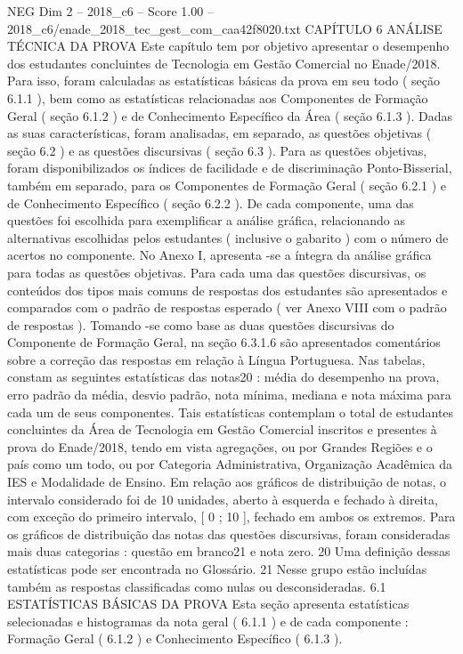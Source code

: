 \begin{textsample}{NEG Dim 2 – 2018\_c6 – Score 1.00 – 2018\_c6/enade\_2018\_tec\_gest\_com\_caa42f8020.txt}  \label{ex:f2_neg_243}
CAPÍTULO 6 ANÁLISE TÉCNICA DA PROVA Este capítulo tem por objetivo apresentar o desempenho dos estudantes concluintes de Tecnologia em Gestão Comercial no Enade/2018.
Para isso, foram calculadas as estatísticas básicas da prova em seu todo ( seção 6.1.1 ), bem como as estatísticas relacionadas aos Componentes de Formação Geral ( seção 6.1.2 ) e de Conhecimento Específico da Área ( seção 6.1.3 ).
Dadas as suas características, foram analisadas, em separado, as questões objetivas ( seção 6.2 ) e as questões discursivas ( seção 6.3 ).
Para as questões objetivas, foram disponibilizados os índices de facilidade e de discriminação Ponto-Bisserial, também em separado, para os Componentes de Formação Geral ( seção 6.2.1 ) e de Conhecimento Específico ( seção 6.2.2 ).
De cada componente, uma das questões foi escolhida para exemplificar a análise gráfica, relacionando as alternativas escolhidas pelos estudantes ( inclusive o gabarito ) com o número de acertos no componente.
No Anexo I, apresenta -se a íntegra da análise gráfica para todas as questões objetivas.
Para cada uma das questões discursivas, os conteúdos dos tipos mais comuns de respostas dos estudantes são apresentados e comparados com o padrão de respostas esperado ( ver Anexo VIII com o padrão de respostas ).
Tomando -se como base as duas questões discursivas do Componente de Formação Geral, na seção 6.3.1.6 são apresentados comentários sobre a correção das respostas em relação à Língua Portuguesa.
Nas tabelas, constam as seguintes estatísticas das notas20 : média do desempenho na prova, erro padrão da média, desvio padrão, nota mínima, mediana e nota máxima para cada um de seus componentes.
Tais estatísticas contemplam o total de estudantes concluintes da Área de Tecnologia em Gestão Comercial inscritos e presentes à prova do Enade/2018, tendo em vista agregações, ou por Grandes Regiões e o país como um todo, ou por Categoria Administrativa, Organização Acadêmica da IES e Modalidade de Ensino.
Em relação aos gráficos de distribuição de notas, o intervalo considerado foi de 10 unidades, aberto à esquerda e fechado à direita, com exceção do primeiro intervalo, [ 0 ; 10 ], fechado em ambos os extremos.
Para os gráficos de distribuição das notas das questões discursivas, foram consideradas mais duas categorias : questão em branco21 e nota zero. 20 Uma definição dessas estatísticas pode ser encontrada no Glossário. 21 Nesse grupo estão incluídas também as respostas classificadas como nulas ou desconsideradas. 6.1 ESTATÍSTICAS BÁSICAS DA PROVA Esta seção apresenta estatísticas selecionadas e histogramas da nota geral ( 6.1.1 ) e de cada componente : Formação Geral ( 6.1.2 ) e Conhecimento Específico ( 6.1.3 ).

\end{textsample}
